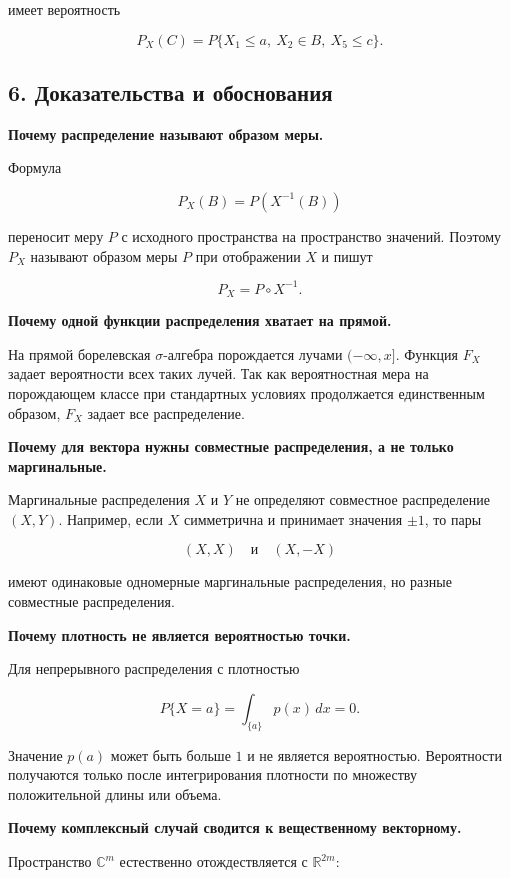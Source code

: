 \documentclass[
  11pt,
  a4paper,
]{article}
\begin{document}
имеет вероятность

\[
P_X(C)=P\{X_1\le a,\ X_2\in B,\ X_5\le c\}.
\]

\subsection{6. Доказательства и
обоснования}\label{ux434ux43eux43aux430ux437ux430ux442ux435ux43bux44cux441ux442ux432ux430-ux438-ux43eux431ux43eux441ux43dux43eux432ux430ux43dux438ux44f}

\textbf{Почему распределение называют образом меры.}

Формула

\[
P_X(B)=P(X^{-1}(B))
\]

переносит меру \(P\) с исходного пространства на пространство значений.
Поэтому \(P_X\) называют образом меры \(P\) при отображении \(X\) и
пишут

\[
P_X=P\circ X^{-1}.
\]

\textbf{Почему одной функции распределения хватает на прямой.}

На прямой борелевская \(\sigma\)-алгебра порождается лучами
\((-\infty,x]\). Функция \(F_X\) задает вероятности всех таких лучей.
Так как вероятностная мера на порождающем классе при стандартных
условиях продолжается единственным образом, \(F_X\) задает все
распределение.

\textbf{Почему для вектора нужны совместные распределения, а не только
маргинальные.}

Маргинальные распределения \(X\) и \(Y\) не определяют совместное
распределение \((X,Y)\). Например, если \(X\) симметрична и принимает
значения \(\pm1\), то пары

\[
(X,X)
\quad\text{и}\quad
(X,-X)
\]

имеют одинаковые одномерные маргинальные распределения, но разные
совместные распределения.

\textbf{Почему плотность не является вероятностью точки.}

Для непрерывного распределения с плотностью

\[
P\{X=a\}=\int_{\{a\}}p(x)\,dx=0.
\]

Значение \(p(a)\) может быть больше \(1\) и не является вероятностью.
Вероятности получаются только после интегрирования плотности по
множеству положительной длины или объема.

\textbf{Почему комплексный случай сводится к вещественному векторному.}

Пространство \(\mathbb C^m\) естественно отождествляется с
\(\mathbb R^{2m}\):
\end{document}
